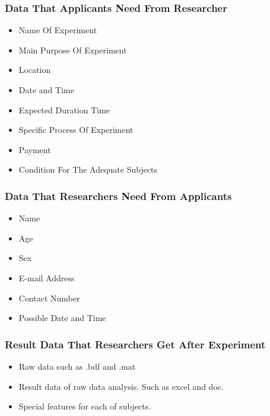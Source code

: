 \documentclass[letterpaper, 10 pt, conference]{ieeeconf}  %
\begin{document}
\subsubsection{\textbf{Data That Applicants Need From Researcher}\\}
\begin{itemize}
\item Name Of Experiment
\item Main Purpose Of Experiment
\item Location
\item Date and Time 
\item Expected Duration Time
\item Specific Process Of Experiment
\item Payment
\item Condition For The Adequate Subjects\\
\end{itemize}



\subsubsection{\textbf{Data That Researchers Need From Applicants\\}}
\begin{itemize}
\item Name
\item Age
\item Sex
\item E-mail Address
\item Contact Number
\item Possible Date and Time\\
\end{itemize}

\subsubsection{\textbf{Result Data That Researchers Get After Experiment\\} }
\begin{itemize}
\item Raw data such as .bdf and .mat
\item Result data of raw data analysis. Such as excel and doc.
\item Special features for each of subjects.\\
\end{itemize}
\end{document}
